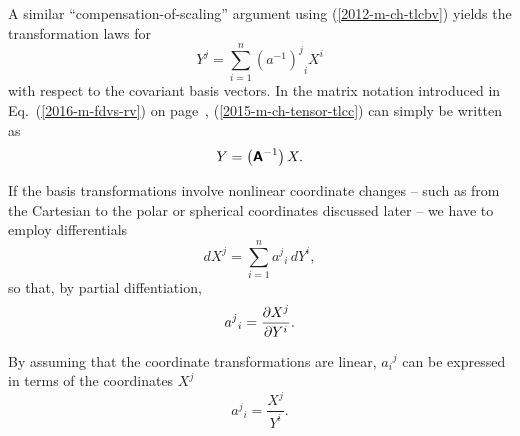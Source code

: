 A similar ``compensation-of-scaling'' argument using
(\ref{2012-m-ch-tlcbv})
yields the transformation laws for
\begin{equation}
{ Y }^j   = \sum_{i=1}^n {(a^{-1})^j}_i {X}^i
\label{2015-m-ch-tensor-tlcc}
\end{equation}
with respect to the covariant basis vectors.
In the matrix notation introduced in Eq.~(\ref{2016-m-fdvs-rv}) on page~\pageref{2016-m-fdvs-rv},
(\ref{2015-m-ch-tensor-tlcc}) can simply be written as
\begin{equation}
 Y    =  \left(\textsf{\textbf{A}}^{-1}\right) X.
\label{2016-m-ch-di-tlcc-mn}
\end{equation}


If the basis transformations involve nonlinear coordinate changes -- such as from the
Cartesian to the polar or spherical coordinates discussed later -- we have to employ differentials
\begin{equation}
dX^j   = \sum_{i=1}^n {a^j}_i \,d{ Y }^i  ,
\label{2012-m-ch-di-choic11}
\end{equation}
so that, by partial diffentiation,
\begin{equation}
{a^j}_i ={\partial X^j \over \partial  Y ^i}   .
\label{2001-mu-tensor-tl11}
\end{equation}

By assuming that the coordinate transformations are linear, ${a_i}^j$ can be expressed in terms of the coordinates $X^j$
\begin{equation}
{a^j}_i =\frac{  X^j }{   Y ^i}  .
\label{2001-mu-tensor-tl1}
\end{equation}


